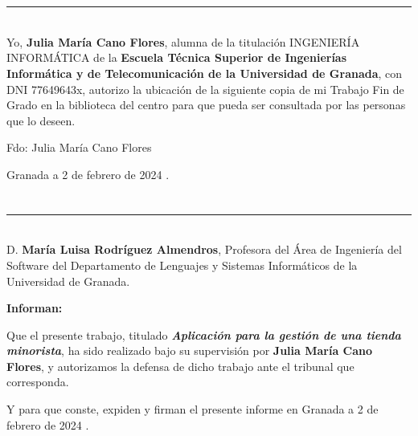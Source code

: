 \chapter*{}



\noindent\rule[-1ex]{\textwidth}{2pt}\\[4.5ex]

Yo, \textbf{Julia María Cano Flores}, alumna de la titulación INGENIERÍA INFORMÁTICA de la \textbf{Escuela Técnica Superior
de Ingenierías Informática y de Telecomunicación de la Universidad de Granada}, con DNI 77649643x, autorizo la
ubicación de la siguiente copia de mi Trabajo Fin de Grado en la biblioteca del centro para que pueda ser
consultada por las personas que lo deseen.

\vspace{6cm}

\noindent Fdo: Julia María Cano Flores

\vspace{2cm}

\begin{flushright}
Granada a 2 de febrero de 2024 .
\end{flushright}


\chapter*{}

\noindent\rule[-1ex]{\textwidth}{2pt}\\[4.5ex]

D. \textbf{María Luisa Rodríguez Almendros}, Profesora del Área de Ingeniería del Software del Departamento de Lenguajes y Sistemas Informáticos de la Universidad de Granada.




\vspace{0.5cm}

\textbf{Informan:}

\vspace{0.5cm}

Que el presente trabajo, titulado \textit{\textbf{Aplicación para la gestión de una tienda minorista}},
ha sido realizado bajo su supervisión por \textbf{Julia María Cano Flores}, y autorizamos la defensa de dicho trabajo ante el tribunal
que corresponda.

\vspace{0.5cm}

Y para que conste, expiden y firman el presente informe en Granada a 2 de febrero de 2024 .

